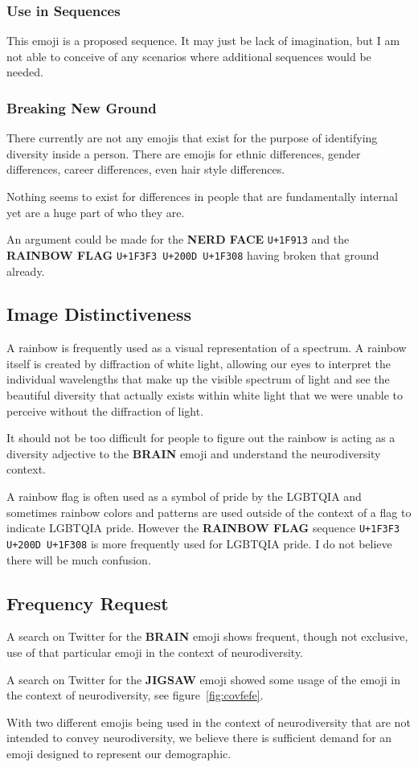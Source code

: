 \subsubsection{Use in Sequences}

This emoji is a proposed sequence. It may just be lack of imagination, but I am not able to
conceive of any scenarios where additional sequences would be needed.

\subsubsection{Breaking New Ground}

There currently are not any emojis that exist for the purpose of identifying diversity inside
a person. There are emojis for ethnic differences, gender differences, career differences,
even hair style differences.

Nothing seems to exist for differences in people that are fundamentally internal yet are a
huge part of who they are.

An argument could be made for the \textbf{NERD FACE} \texttt{U+1F913} and the
\textbf{RAINBOW FLAG} \texttt{U+1F3F3 U+200D U+1F308} having broken that ground already.

\subsection{Image Distinctiveness}

A rainbow is frequently used as a visual representation of a spectrum. A rainbow itself is
created by diffraction of white light, allowing our eyes to interpret the individual
wavelengths that make up the visible spectrum of light and see the beautiful diversity that
actually exists within white light that we were unable to perceive without the diffraction of
light.

It should not be too difficult for people to figure out the rainbow is acting as a diversity
adjective to the \textbf{BRAIN} emoji and understand the neurodiversity context.

A rainbow flag is often used as a symbol of pride by the LGBTQIA and sometimes rainbow colors
and patterns are used outside of the context of a flag to indicate LGBTQIA pride. However the
\textbf{RAINBOW FLAG} sequence \texttt{U+1F3F3 U+200D U+1F308} is more frequently used for
LGBTQIA pride. I do not believe there will be much confusion.

\subsection{Frequency Request}

A search on Twitter for the \textbf{BRAIN} emoji shows frequent, though not exclusive, use of
that particular emoji in the context of neurodiversity.

A search on Twitter for the \textbf{JIGSAW} emoji showed some usage of the emoji in the context
of neurodiversity, see figure~\ref{fig:covfefe}.

With two different emojis being used in the context of neurodiversity that are not intended to
convey neurodiversity, we believe there is sufficient demand for an emoji designed to represent
our demographic.

